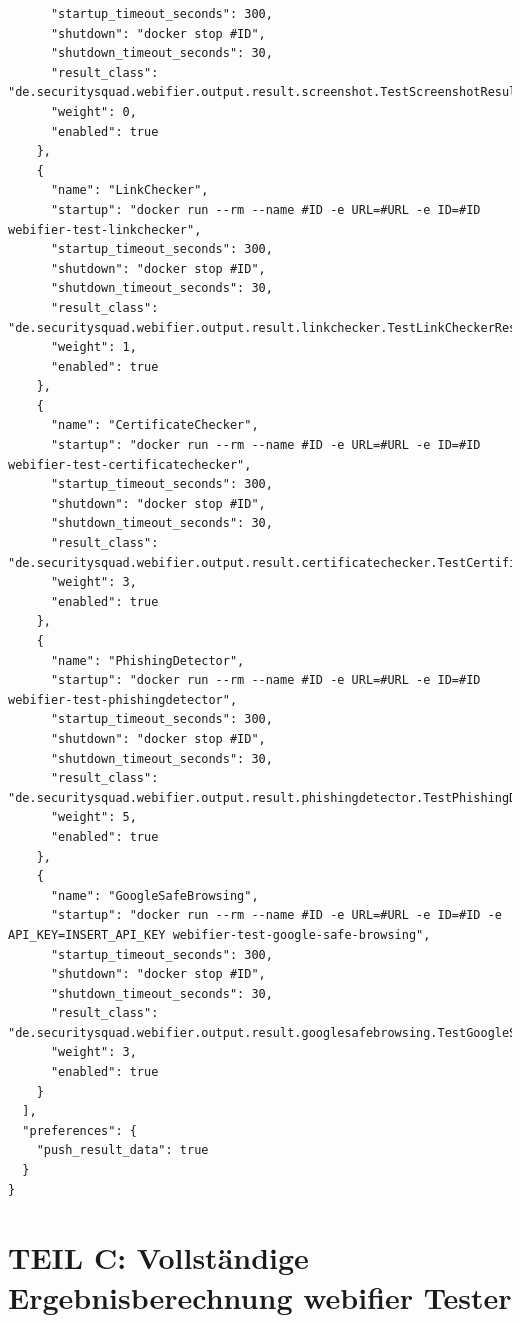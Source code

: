 \begin{scriptsize}
\begin{lstlisting}
      "startup_timeout_seconds": 300,
      "shutdown": "docker stop #ID",
      "shutdown_timeout_seconds": 30,
      "result_class": "de.securitysquad.webifier.output.result.screenshot.TestScreenshotResultInfo",
      "weight": 0,
      "enabled": true
    },
    {
      "name": "LinkChecker",
      "startup": "docker run --rm --name #ID -e URL=#URL -e ID=#ID webifier-test-linkchecker",
      "startup_timeout_seconds": 300,
      "shutdown": "docker stop #ID",
      "shutdown_timeout_seconds": 30,
      "result_class": "de.securitysquad.webifier.output.result.linkchecker.TestLinkCheckerResultInfo",
      "weight": 1,
      "enabled": true
    },
    {
      "name": "CertificateChecker",
      "startup": "docker run --rm --name #ID -e URL=#URL -e ID=#ID webifier-test-certificatechecker",
      "startup_timeout_seconds": 300,
      "shutdown": "docker stop #ID",
      "shutdown_timeout_seconds": 30,
      "result_class": "de.securitysquad.webifier.output.result.certificatechecker.TestCertificateCheckerResultInfo",
      "weight": 3,
      "enabled": true
    },
    {
      "name": "PhishingDetector",
      "startup": "docker run --rm --name #ID -e URL=#URL -e ID=#ID webifier-test-phishingdetector",
      "startup_timeout_seconds": 300,
      "shutdown": "docker stop #ID",
      "shutdown_timeout_seconds": 30,
      "result_class": "de.securitysquad.webifier.output.result.phishingdetector.TestPhishingDetectorResultInfo",
      "weight": 5,
      "enabled": true
    },
    {
      "name": "GoogleSafeBrowsing",
      "startup": "docker run --rm --name #ID -e URL=#URL -e ID=#ID -e API_KEY=INSERT_API_KEY webifier-test-google-safe-browsing",
      "startup_timeout_seconds": 300,
      "shutdown": "docker stop #ID",
      "shutdown_timeout_seconds": 30,
      "result_class": "de.securitysquad.webifier.output.result.googlesafebrowsing.TestGoogleSafeBrowsingResultInfo",
      "weight": 3,
      "enabled": true
    }
  ],
  "preferences": {
    "push_result_data": true
  }
}
\end{lstlisting}
\end{scriptsize}

\newpage

\section*{TEIL C: Vollständige Ergebnisberechnung webifier Tester}
\label{app:c}

